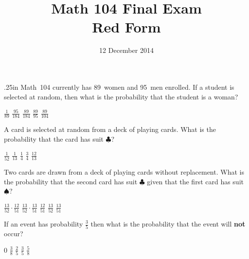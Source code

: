 \documentclass[answers,12pt]{exam}
\title{Math 104 Final Exam\\Red Form}
\date{12 December 2014}
\begin{document}
\maketitle
\begin{center}
\end{center}

\begin{questions}\itemsep.25in
\question Math~104 currently has 89~women and 95~men enrolled.
If a student is selected at random, then what is the probability
that the student is a woman?\\
\begin{oneparchoices}
\choice $\frac{1}{89}$
\choice $\frac{95}{184}$
\correctchoice$\frac{89}{184}$
\choice $\frac{89}{95}$
\choice $\frac{89}{104}$
\end{oneparchoices}

\question A card is selected at random from a deck of
playing cards. What is the probability that
the card has suit $\clubsuit$?\\
\begin{oneparchoices}
\choice $\frac{1}{52}$
\choice $\frac{1}{13}$
\correctchoice $\frac{1}{4}$
\choice $\frac{3}{4}$
\choice $\frac{12}{13}$
\end{oneparchoices}

\question Two cards are drawn from a deck of playing cards
without replacement. What is the probability that
the second card has suit $\clubsuit$ given that the
first card has suit $\spadesuit$?\\
\begin{oneparchoices}
\choice $\frac{13}{52}\cdot\frac{12}{51}$
\choice $\frac{13}{52}\cdot\frac{13}{51}$
\choice $\frac{12}{51}$
\choice $\frac{13}{52}$
\correctchoice $\frac{13}{51}$
\end{oneparchoices}

\question If an event has probability $\frac{3}{5}$
then what is the probability that the event will {\bf not} occur?\\
\begin{oneparchoices}
\choice $0$
\choice $\frac{3}{8}$
\correctchoice $\frac{2}{5}$
\choice $\frac{3}{5}$
\choice $\frac{5}{8}$
\end{oneparchoices}


\end{questions}
\end{document}
